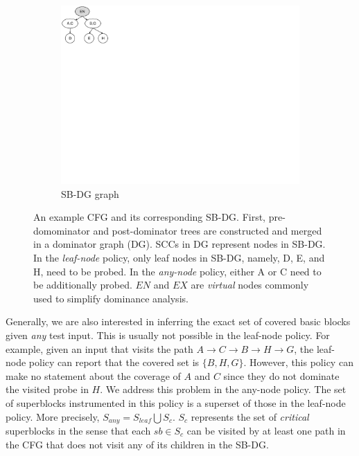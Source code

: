 \begin{figure}[t!]
\begin{subfigure}[t]{0.15\textwidth}
        \includegraphics[clip, trim=0.1cm 12.6cm 20.4cm 0.1cm, width=\textwidth]{fig/bcov-03-sbgraph}
        
        \caption{\small SB-DG graph}
        \label{fig:3:sbgraph}
    \end{subfigure}
    
    \caption{An example CFG and its corresponding SB-DG.
        First, pre-domominator and post-dominator trees are constructed and merged in a dominator graph (DG). 
        SCCs in DG represent nodes in SB-DG.
        In the \textit{leaf-node} policy, only leaf nodes in SB-DG, namely, D, E, and H, need to be probed. 
        In the \textit{any-node} policy, either A or C need to be additionally probed.
        $EN$ and $EX$ are \textit{virtual} nodes commonly used to simplify dominance analysis.        
    }
    \label{fig:probe-pruning}
\end{figure}

Generally, we are also interested in inferring the exact set of covered basic blocks given \textit{any} test input.
This is usually not possible in the leaf-node policy. 
For example, given an input that visits the path $A \rightarrow C \rightarrow B \rightarrow H \rightarrow G$, 
the leaf-node policy can report that the covered set is $\{B,H,G\}$. 
However, this policy can make no statement about the coverage of $A$ and $C$ since they do not dominate the visited probe in $H$.
We address this problem in the any-node policy.
The set of superblocks instrumented in this policy is a superset of those in the leaf-node policy.
More precisely, \mbox{$S_{any}=S_{leaf} \bigcup S_{c}$}.\linebreak
$S_c$ represents the set of \textit{critical} superblocks in the sense that each $sb \in S_c$ can be visited by at least one path in the CFG that does not visit any of its children in the SB-DG.

